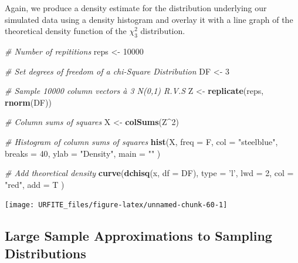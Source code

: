 \documentclass[]{book}
\newenvironment{Shaded}{\begin{snugshade}}{\end{snugshade}}
\newcommand{\KeywordTok}[1]{\textcolor[rgb]{0.13,0.29,0.53}{\textbf{#1}}}
\newcommand{\DataTypeTok}[1]{\textcolor[rgb]{0.13,0.29,0.53}{#1}}
\newcommand{\DecValTok}[1]{\textcolor[rgb]{0.00,0.00,0.81}{#1}}
\newcommand{\StringTok}[1]{\textcolor[rgb]{0.31,0.60,0.02}{#1}}
\newcommand{\CommentTok}[1]{\textcolor[rgb]{0.56,0.35,0.01}{\textit{#1}}}
\newcommand{\OperatorTok}[1]{\textcolor[rgb]{0.81,0.36,0.00}{\textbf{#1}}}
\newcommand{\NormalTok}[1]{#1}
\theoremstyle{definition}
\theoremstyle{definition}
\theoremstyle{definition}
\theoremstyle{remark}
\begin{document}
Again, we produce a density estimate for the distribution underlying our
simulated data using a density histogram and overlay it with a line
graph of the theoretical density function of the \(\chi^2_3\)
distribution.

\begin{Shaded}
\begin{Highlighting}[]
\CommentTok{# Number of repititions}
\NormalTok{reps <-}\StringTok{ }\DecValTok{10000}

\CommentTok{# Set degrees of freedom of a chi-Square Distribution}
\NormalTok{DF <-}\StringTok{ }\DecValTok{3} 

\CommentTok{# Sample 10000 column vectors à 3 N(0,1) R.V.S}
\NormalTok{Z <-}\StringTok{ }\KeywordTok{replicate}\NormalTok{(reps, }\KeywordTok{rnorm}\NormalTok{(DF)) }

\CommentTok{# Column sums of squares}
\NormalTok{X <-}\StringTok{ }\KeywordTok{colSums}\NormalTok{(Z}\OperatorTok{^}\DecValTok{2}\NormalTok{)}

\CommentTok{# Histogram of column sums of squares}
\KeywordTok{hist}\NormalTok{(X, }
     \DataTypeTok{freq =}\NormalTok{ F, }
     \DataTypeTok{col =} \StringTok{"steelblue"}\NormalTok{, }
     \DataTypeTok{breaks =} \DecValTok{40}\NormalTok{, }
     \DataTypeTok{ylab =} \StringTok{"Density"}\NormalTok{, }
     \DataTypeTok{main =} \StringTok{""}
\NormalTok{     )}

\CommentTok{# Add theoretical density}
\KeywordTok{curve}\NormalTok{(}\KeywordTok{dchisq}\NormalTok{(x, }\DataTypeTok{df =}\NormalTok{ DF), }
      \DataTypeTok{type =} \StringTok{'l'}\NormalTok{, }
      \DataTypeTok{lwd =} \DecValTok{2}\NormalTok{, }
      \DataTypeTok{col =} \StringTok{"red"}\NormalTok{, }
      \DataTypeTok{add =}\NormalTok{ T}
\NormalTok{      )}
\end{Highlighting}
\end{Shaded}

\begin{center}\texttt{[image: URFITE\_files/figure-latex/unnamed-chunk-60-1]} \end{center}

\subsection*{Large Sample Approximations to Sampling
Distributions}\label{large-sample-approximations-to-sampling-distributions}
\end{document}
